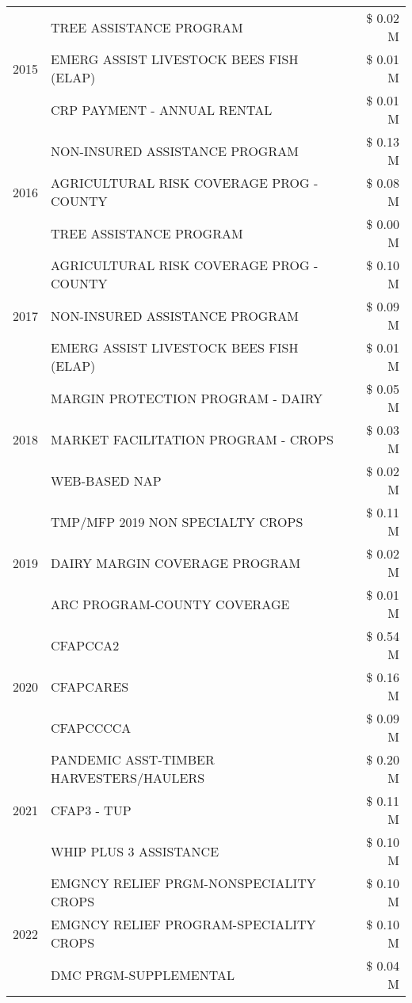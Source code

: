 \begin{tabular}{llr}
\cline{1-3}
\multirow[t]{3}{*}{2015} & TREE ASSISTANCE PROGRAM & \$ 0.02 M \\
 & EMERG ASSIST LIVESTOCK BEES FISH (ELAP) & \$ 0.01 M \\
 & CRP PAYMENT - ANNUAL RENTAL & \$ 0.01 M \\
\cline{1-3}
\multirow[t]{3}{*}{2016} & NON-INSURED ASSISTANCE PROGRAM & \$ 0.13 M \\
 & AGRICULTURAL RISK COVERAGE PROG - COUNTY & \$ 0.08 M \\
 & TREE ASSISTANCE PROGRAM & \$ 0.00 M \\
\cline{1-3}
\multirow[t]{3}{*}{2017} & AGRICULTURAL RISK COVERAGE PROG - COUNTY & \$ 0.10 M \\
 & NON-INSURED ASSISTANCE PROGRAM & \$ 0.09 M \\
 & EMERG ASSIST LIVESTOCK BEES FISH (ELAP) & \$ 0.01 M \\
\cline{1-3}
\multirow[t]{3}{*}{2018} & MARGIN PROTECTION PROGRAM - DAIRY & \$ 0.05 M \\
 & MARKET FACILITATION PROGRAM - CROPS & \$ 0.03 M \\
 & WEB-BASED NAP & \$ 0.02 M \\
\cline{1-3}
\multirow[t]{3}{*}{2019} & TMP/MFP 2019 NON SPECIALTY CROPS & \$ 0.11 M \\
 & DAIRY MARGIN COVERAGE PROGRAM & \$ 0.02 M \\
 & ARC PROGRAM-COUNTY COVERAGE & \$ 0.01 M \\
\cline{1-3}
\multirow[t]{3}{*}{2020} & CFAPCCA2 & \$ 0.54 M \\
 & CFAPCARES & \$ 0.16 M \\
 & CFAPCCCCA & \$ 0.09 M \\
\cline{1-3}
\multirow[t]{3}{*}{2021} & PANDEMIC ASST-TIMBER HARVESTERS/HAULERS & \$ 0.20 M \\
 & CFAP3 - TUP & \$ 0.11 M \\
 & WHIP PLUS 3 ASSISTANCE & \$ 0.10 M \\
\cline{1-3}
\multirow[t]{3}{*}{2022} & EMGNCY RELIEF PRGM-NONSPECIALITY CROPS & \$ 0.10 M \\
 & EMGNCY RELIEF PROGRAM-SPECIALITY CROPS & \$ 0.10 M \\
 & DMC PRGM-SUPPLEMENTAL & \$ 0.04 M \\
\cline{1-3}
\bottomrule
\end{tabular}
